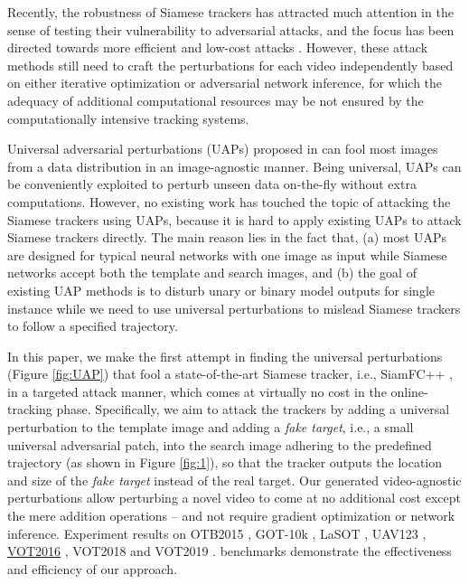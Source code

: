 \documentclass[journal]{IEEEtran}
\newcommand{\ie}{i.e.}
\begin{document}
Recently, the robustness of Siamese trackers has attracted much attention in the sense of testing their vulnerability to adversarial attacks, and the focus has been directed towards more efficient and low-cost attacks \cite{TTP,FAN,SPARK,chen2020one}. However, these attack methods still need to craft the perturbations for each video independently based on either iterative optimization or adversarial network inference, for which the adequacy of additional computational resources may be not ensured by the computationally intensive tracking systems. 

Universal adversarial perturbations (UAPs) proposed in \cite{UAP} can fool most images from a data distribution in an image-agnostic manner. Being universal, UAPs can be conveniently exploited to perturb unseen data on-the-fly without extra computations. However, no existing work has touched the topic of attacking the Siamese trackers using UAPs, because it is hard to apply existing UAPs to attack Siamese trackers directly. The main reason lies in the fact that, (a) most UAPs are designed for typical neural networks with one image as input while Siamese networks accept both the template and search images, and (b) the goal of existing UAP methods is to disturb unary or binary model outputs for single instance while we need to use universal perturbations to mislead Siamese trackers to follow a specified trajectory.
  
In this paper, we make the first attempt in finding the universal perturbations (Figure \ref{fig:UAP}) that fool a state-of-the-art Siamese tracker, \ie, SiamFC++ \cite{SiamFC++}, in a targeted attack manner, which comes at virtually no cost in the online-tracking phase. Specifically, we aim to attack the trackers by adding a universal perturbation to the template image and adding a \textit{fake target}, \ie, a small universal adversarial patch, into the search image adhering to the predefined trajectory (as shown in Figure \ref{fig:1}), so that the tracker outputs the location and size of the \textit{fake target} instead of the real target. Our generated video-agnostic perturbations allow perturbing a novel video to come at no additional cost except the mere addition operations -- and not require gradient optimization or network inference. Experiment results on OTB2015 \cite{OTB}, GOT-10k \cite{GOT-10k}, LaSOT \uline{\cite{LaSOT}}, UAV123 \cite{UAV123}, \uline{VOT2016} \cite{VOT2016}, VOT2018 \cite{VOT2018} and VOT2019 \cite{VOT2019}. benchmarks demonstrate the effectiveness and efficiency of our approach.
\end{document}
